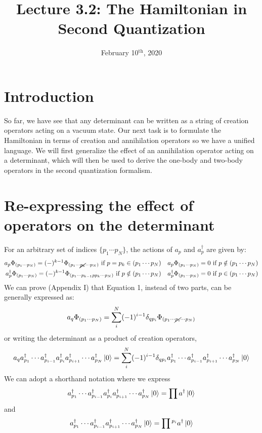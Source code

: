 \documentclass{article}
\title{Lecture 3.2: The Hamiltonian in Second Quantization}
\date{February 10$^{\text{th}}$, 2020}
\newcommand{\ap}{\ensuremath{a_p} }
\newcommand{\dg}{\ensuremath{^\dagger} }
\newcommand{\cd}{\ensuremath{\cdots} }
\newcommand{\apd}{\ensuremath{a_p^\dagger} }
\begin{document}
\maketitle
\noindent
\section{Introduction }
So far, we have see that any determinant can be written as a string of creation operators acting on a vacuum state. 
Our next task is to formulate the Hamiltonian in terms of creation and annihilation operators so we have a unified language. 
We will first generalize the effect of an annihilation operator acting on a determinant, which will then be used to derive the one-body and two-body operators 
in the second quantization formalism. 

\section{Re-expressing the effect of operators on the determinant }
For an arbitrary set of indices $\{p_1 \cdots p_N\}$, the actions of \ap and \apd are given by: 
 \begin{align}
   a_p\Phi_{(p_1\cd p_N)}
 =
   (-)^{k-1}\Phi_{(p_1\cd\cancel{p_k}\cd p_N)}
   \ \text{if $p=p_k\in(p_1\cd p_N)$}
 &&
   a_p\Phi_{(p_1\cd p_N)}
 =
   0
   \ \text{if $p\notin(p_1\cd p_N)$}
 \\
   a_p\dg\Phi_{(p_1\cd p_N)}
 =
   (-)^{k-1}\Phi_{(p_1\cd p_{k-1}pp_k\cd p_N)}
   \ \text{if $p\notin(p_1\cd p_N)$}
 &&
   a_p\dg\Phi_{(p_1\cd p_N)}
 =
   0
   \ \text{if $p\in(p_1\cd p_N)$}
 \end{align}
We can prove (Appendix I) that Equation 1, instead of two parts, can be generally expressed as: 
\begin{equation}
a_q \Phi_{(p_1\cd p_N)} =  \sum_i^N (-1)^{i-1} \delta_{qp_i} \Phi_{(p_1\cd\cancel{p_i}\cd p_N)} 
\end{equation}
or writing the determinant as a product of creation operators, 
\begin{equation}
a_q a_{p_1}\dg \cd a_{p_{i -1}}\dg a_{p_i}\dg a_{p_{i +1}}\dg \cd a_{p_N}\dg \ket{0}=  \sum_i^N (-1)^{i-1} \delta_{qp_i} a_{p_1}\dg \cd a_{p_{i -1}}\dg a_{p_{i +1}}\dg \cd a_{p_N}\dg \ket{0}
\end{equation}
We can adopt a shorthand notation where we express 
\[a_{p_1}\dg \cd a_{p_{i -1}}\dg a_{p_i}\dg a_{p_{i +1}}\dg \cd a_{p_N}\dg \ket{0} = \prod a\dg \ket{0}\]
and 
\[a_{p_1}\dg \cd a_{p_{i -1}}\dg a_{p_{i +1}}\dg \cd a_{p_N}\dg \ket{0} =  \prod{}^{p_i} a\dg \ket{0} \]
\end{document}
